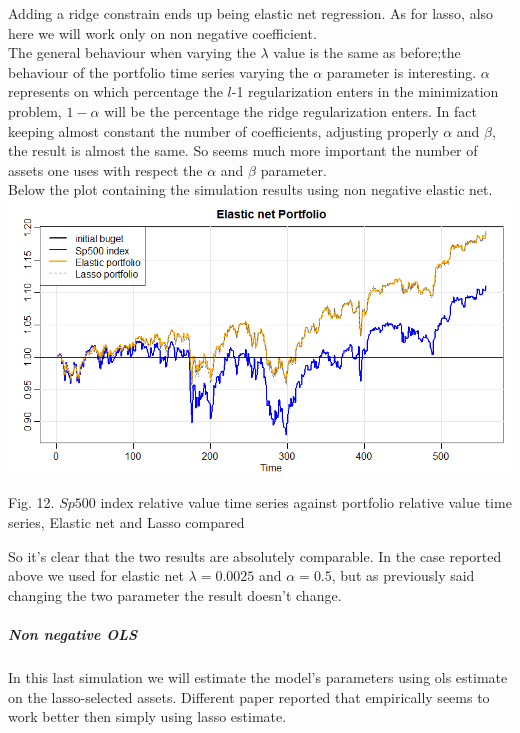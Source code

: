 \documentclass{article}%
\begin{document}
Adding a ridge constrain ends up being elastic net regression. As for lasso, also here we will work only on non negative coefficient.
\\

The general behaviour when varying the $\lambda$ value is the same as before;the behaviour of the portfolio time series varying the $\alpha$ parameter is interesting. $\alpha$ represents on which percentage the $l$-1 regularization enters in the minimization problem, $1-\alpha$ will be the percentage the ridge regularization enters. In fact keeping almost constant the number of coefficients, adjusting properly $\alpha$ and $\beta$, the result is almost the same. So seems much more important the number of assets one uses with respect the $\alpha$ and $\beta$ parameter.
\\

Below the plot containing the simulation results using non negative elastic net.
\\

\includegraphics[scale=0.55]{elasticportfolio}
\begin{center}
\begin{small}
Fig. 12. $Sp500$ index relative value time series against portfolio relative value time series, Elastic net and Lasso compared
\\

\end{small}
\end{center}


So it's clear that the two results are absolutely comparable. In the case reported above we used for elastic net $\lambda=0.0025$ and $\alpha=0.5$, but as previously said changing the two parameter the result doesn't change.

\subparagraph{Non negative OLS}
In this last simulation we will estimate the model's parameters using ols estimate on the lasso-selected assets. Different paper reported that empirically seems to work better then simply using lasso estimate. 
\end{document}
